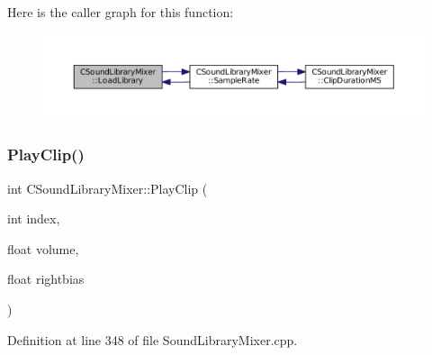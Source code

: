 Here is the caller graph for this function\+:
\nopagebreak
\begin{figure}[H]
\begin{center}
\leavevmode
\includegraphics[width=350pt]{classCSoundLibraryMixer_a9753684f44863e3c7cc4d319370cda1d_icgraph}
\end{center}
\end{figure}
\hypertarget{classCSoundLibraryMixer_a9af6d9e3dacf63b07a7ad75e629bdc2f}{}\label{classCSoundLibraryMixer_a9af6d9e3dacf63b07a7ad75e629bdc2f} 
\subsubsection{\texorpdfstring{Play\+Clip()}{PlayClip()}}
{\footnotesize\ttfamily int C\+Sound\+Library\+Mixer\+::\+Play\+Clip (\begin{DoxyParamCaption}\item[{int}]{index,  }\item[{float}]{volume,  }\item[{float}]{rightbias }\end{DoxyParamCaption})}



Definition at line 348 of file Sound\+Library\+Mixer.\+cpp.


